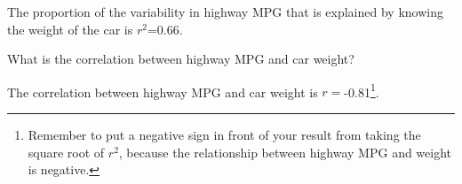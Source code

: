 \documentclass[10pt,openany]{book}\usepackage[]{graphicx}\usepackage[]{color}
\begin{document}
\begin{QAlist}
  \begin{QAlist}
    \item The proportion of the variability in highway MPG that is explained by knowing the weight of the car is $r^{2}$=0.66.
  \end{QAlist}
  \item What is the correlation between highway MPG and car weight?
  \begin{QAlist}
    \item The correlation between highway MPG and car weight is $r=$-0.81\footnote{Remember to put a negative sign in front of your result from taking the square root of $r^2$, because the relationship between highway MPG and weight is negative.}.
  \end{QAlist}
\end{QAlist}
\end{document}
